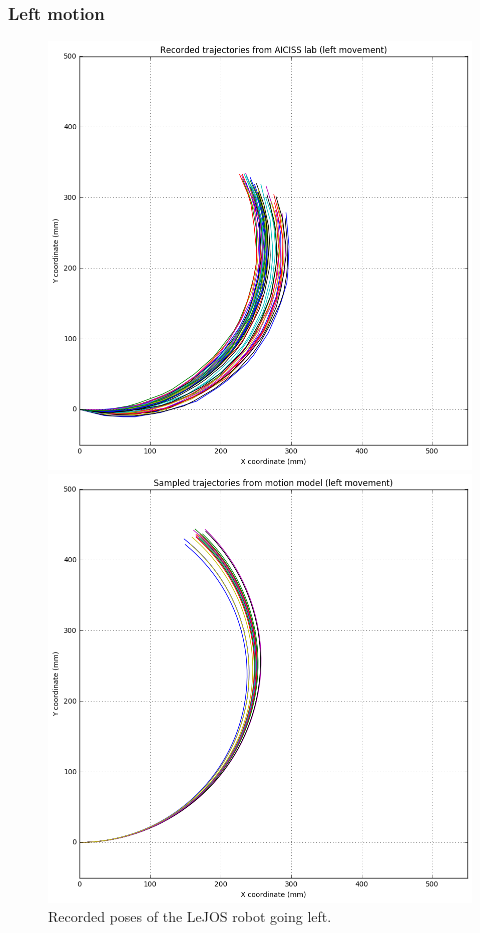 \documentclass[paper=a4, fontsize=11pt]{scrartcl} %
\begin{document}
    \subsubsection*{Left motion}
    \begin{figure}[H]
        \centering
        \begin{minipage}{0.5\textwidth}
            \centering
            \includegraphics[width=1\textwidth]{images/recorded_poses_left.png} %
            \caption{Recorded poses of the LeJOS robot going left.}
        \end{minipage}\hfill
        \begin{minipage}{0.5\textwidth}
            \centering
            \includegraphics[width=1\textwidth]{images/sampled_poses_left.png} %

\end{minipage}
\end{figure}
\end{document}
